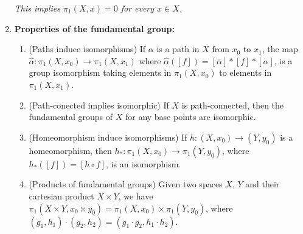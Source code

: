 \documentclass[letterpaper, 12pt]{article}
\begin{document}
\begin{enumerate}[resume]
{            \textit{This implies $\pi_1(X,x)=0$ for every $x\in X$.}}
        \item \textbf{Properties of the fundamental group:}
            \begin{enumerate}
            \item (Paths induce isomorphisms) If $\alpha$ is a path in $X$ from $x_0$ to $x_1$, the map $\hat\alpha : \pi_1(X,x_0)\to \pi_1(X,x_1)$ where $\hat\alpha([f]) = [\bar\alpha]*[f]*[\alpha]$, is a group isomorphism taking elements in $\pi_1(X,x_0)$ to elements in $\pi_1(X,x_1)$.
            \item (Path-conected implies isomorphic) If $X$ is path-connected, then the fundamental groups of $X$ for any base points are isomorphic.
            \item (Homeomorphism induce isomorphisms) If $h:(X,x_0) \to (Y,y_0)$ is a homeomorphism, then $h_* : \pi_1(X,x_0)\to\pi_1(Y,y_0)$, where $h_*([f]) = [h\circ f]$, is an isomorphism.
            \item (Products of fundamental groups) Given two spaces $X$, $Y$ and their cartesian product $X\times Y$, we have $\pi_1(X\times Y, x_0\times y_0) = \pi_1(X,x_0) \times \pi_1(Y,y_0)$, where $(g_1,h_1)\cdot(g_2,h_2) = (g_1\cdot g_2, h_1\cdot h_2)$.
            \end{enumerate}
        \end{enumerate}
\end{document}
